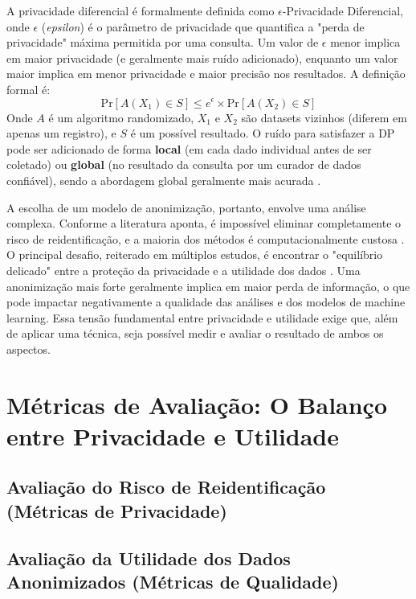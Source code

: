 A privacidade diferencial é formalmente definida como $\epsilon$-Privacidade Diferencial, onde $\epsilon$ (\textit{epsilon}) é o parâmetro de privacidade que quantifica a "perda de privacidade" máxima permitida por uma consulta. Um valor de $\epsilon$ menor implica em maior privacidade (e geralmente mais ruído adicionado), enquanto um valor maior implica em menor privacidade e maior precisão nos resultados. A definição formal é:
$$\text{Pr}[A(X_1) \in S] \leq e^{\epsilon} \times \text{Pr}[A(X_2) \in S]$$
Onde $A$ é um algoritmo randomizado, $X_1$ e $X_2$ são datasets vizinhos (diferem em apenas um registro), e $S$ é um possível resultado. O ruído para satisfazer a DP pode ser adicionado de forma \textbf{local} (em cada dado individual antes de ser coletado) ou \textbf{global} (no resultado da consulta por um curador de dados confiável), sendo a abordagem global geralmente mais acurada \cite{Olatunji2024}.

A escolha de um modelo de anonimização, portanto, envolve uma análise complexa. Conforme a literatura aponta, é impossível eliminar completamente o risco de reidentificação, e a maioria dos métodos é computacionalmente custosa \cite{Sepas2022}. O principal desafio, reiterado em múltiplos estudos, é encontrar o "equilíbrio delicado" entre a proteção da privacidade e a utilidade dos dados \cite{Vovk2023, Olatunji2024}. Uma anonimização mais forte geralmente implica em maior perda de informação, o que pode impactar negativamente a qualidade das análises e dos modelos de machine learning. Essa tensão fundamental entre privacidade e utilidade exige que, além de aplicar uma técnica, seja possível medir e avaliar o resultado de ambos os aspectos.

\section{Métricas de Avaliação: O Balanço entre Privacidade e Utilidade}
\label{sec:fund-metricas}

\subsection{Avaliação do Risco de Reidentificação (Métricas de Privacidade)}
\label{subsec:fund-metricas-privacidade}

\subsection{Avaliação da Utilidade dos Dados Anonimizados (Métricas de Qualidade)}
\label{subsec:fund-metricas-utilidade}


